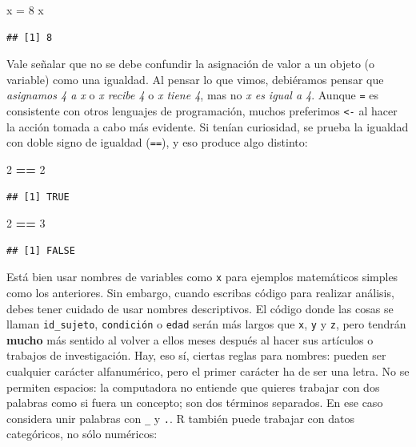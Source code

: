 \documentclass[
]{article}
\newenvironment{Shaded}{\begin{snugshade}}{\end{snugshade}}
\newcommand{\DecValTok}[1]{\textcolor[rgb]{0.00,0.00,0.81}{#1}}
\newcommand{\NormalTok}[1]{#1}
\newcommand{\OtherTok}[1]{\textcolor[rgb]{0.56,0.35,0.01}{#1}}
\newcommand{\SpecialCharTok}[1]{\textcolor[rgb]{0.81,0.36,0.00}{\textbf{#1}}}
\begin{document}
\begin{Shaded}
\begin{Highlighting}[]
\NormalTok{x }\OtherTok{=} \DecValTok{8}
\NormalTok{x}
\end{Highlighting}
\end{Shaded}

\begin{verbatim}
## [1] 8
\end{verbatim}

Vale señalar que no se debe confundir la asignación de valor a un objeto
(o variable) como una igualdad. Al pensar lo que vimos, debiéramos
pensar que \emph{asignamos 4 a x} o \emph{x recibe 4} o \emph{x tiene
4}, mas no \emph{x es igual a 4}. Aunque \texttt{=} es consistente con
otros lenguajes de programación, muchos preferimos \texttt{\textless{}-}
al hacer la acción tomada a cabo más evidente. Si tenían curiosidad, se
prueba la igualdad con doble signo de igualdad (\texttt{==}), y eso
produce algo distinto:

\begin{Shaded}
\begin{Highlighting}[]
\DecValTok{2} \SpecialCharTok{==} \DecValTok{2}
\end{Highlighting}
\end{Shaded}

\begin{verbatim}
## [1] TRUE
\end{verbatim}

\begin{Shaded}
\begin{Highlighting}[]
\DecValTok{2} \SpecialCharTok{==} \DecValTok{3}
\end{Highlighting}
\end{Shaded}

\begin{verbatim}
## [1] FALSE
\end{verbatim}

Está bien usar nombres de variables como \texttt{x} para ejemplos
matemáticos simples como los anteriores. Sin embargo, cuando escribas
código para realizar análisis, debes tener cuidado de usar nombres
descriptivos. El código donde las cosas se llaman \texttt{id\_sujeto},
\texttt{condición} o \texttt{edad} serán más largos que \texttt{x},
\texttt{y} y \texttt{z}, pero tendrán \textbf{mucho} más sentido al
volver a ellos meses después al hacer sus artículos o trabajos de
investigación. Hay, eso sí, ciertas reglas para nombres: pueden ser
cualquier carácter alfanumérico, pero el primer carácter ha de ser una
letra. No se permiten espacios: la computadora no entiende que quieres
trabajar con dos palabras como si fuera un concepto; son dos términos
separados. En ese caso considera unir palabras con \texttt{\_} y
\texttt{.}. R también puede trabajar con datos categóricos, no sólo
numéricos:
\end{document}

